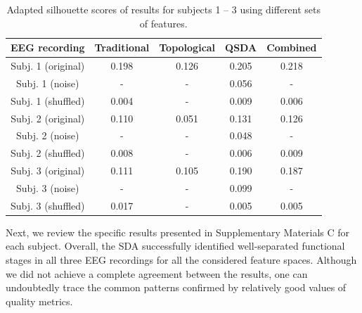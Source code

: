 \documentclass[journal,twoside,web]{ieeecolor2}
\begin{document}
\begin{table}
\begin{center}
\caption{Adapted silhouette scores of results for subjects 1 -- 3 using different sets of features.}
\label{table1}
\begin{tabular}{| c | c | c | c | c |}
  \hline
        EEG recording & Traditional & Topological & QSDA & Combined\\
  \hline
        Subj. 1 (original)       & 0.198 & 0.126 & 0.205 & 0.218 \\
        Subj. 1 (noise) & -     & -     & 0.056 & -     \\
        Subj. 1 (shuffled)       & 0.004 & -     & 0.009 & 0.006 \\
  \hline
        Subj. 2 (original)       & 0.110 & 0.051 & 0.131 & 0.126 \\
        Subj. 2 (noise) & -     & -     & 0.048 & -     \\
        Subj. 2 (shuffled)       & 0.008 & -     & 0.006 & 0.009 \\
  \hline
        Subj. 3 (original)       & 0.111 & 0.105 & 0.190 & 0.187 \\
        Subj. 3 (noise) & -     & -     & 0.099 & -     \\
        Subj. 3 (shuffled)       & 0.017 & -     & 0.005 & 0.005 \\
  \hline
\end{tabular}
\end{center}
\end{table}

Next, we review the specific results presented in Supplementary Materials C for each subject. Overall, the SDA successfully identified well-separated functional stages in all three EEG recordings for all the considered feature spaces. Although we did not achieve a complete agreement between the results, one can undoubtedly trace the common patterns confirmed by relatively good values of quality metrics.
\end{document}
